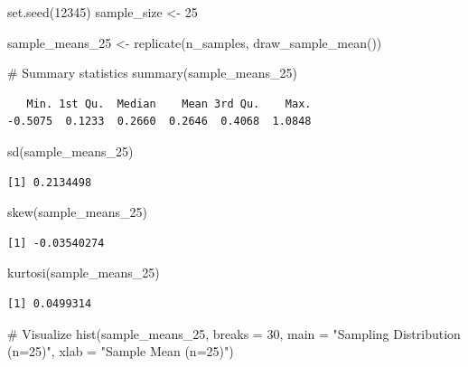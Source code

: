 \documentclass[
  letterpaper,
  DIV=11,
  numbers=noendperiod]{scrreprt}
\newenvironment{Shaded}{\begin{snugshade}}{\end{snugshade}}
\newcommand{\AttributeTok}[1]{\textcolor[rgb]{0.40,0.45,0.13}{#1}}
\newcommand{\CommentTok}[1]{\textcolor[rgb]{0.37,0.37,0.37}{#1}}
\newcommand{\DecValTok}[1]{\textcolor[rgb]{0.68,0.00,0.00}{#1}}
\newcommand{\FunctionTok}[1]{\textcolor[rgb]{0.28,0.35,0.67}{#1}}
\newcommand{\NormalTok}[1]{\textcolor[rgb]{0.00,0.23,0.31}{#1}}
\newcommand{\OtherTok}[1]{\textcolor[rgb]{0.00,0.23,0.31}{#1}}
\newcommand{\StringTok}[1]{\textcolor[rgb]{0.13,0.47,0.30}{#1}}
\begin{document}
\begin{Shaded}
\begin{Highlighting}[]
\FunctionTok{set.seed}\NormalTok{(}\DecValTok{12345}\NormalTok{) }
\NormalTok{sample\_size }\OtherTok{\textless{}{-}} \DecValTok{25} 
 
\NormalTok{sample\_means\_25 }\OtherTok{\textless{}{-}} \FunctionTok{replicate}\NormalTok{(n\_samples, }\FunctionTok{draw\_sample\_mean}\NormalTok{()) }
 
\CommentTok{\# Summary statistics }
\FunctionTok{summary}\NormalTok{(sample\_means\_25) }
\end{Highlighting}
\end{Shaded}

\begin{verbatim}
   Min. 1st Qu.  Median    Mean 3rd Qu.    Max. 
-0.5075  0.1233  0.2660  0.2646  0.4068  1.0848 
\end{verbatim}

\begin{Shaded}
\begin{Highlighting}[]
\FunctionTok{sd}\NormalTok{(sample\_means\_25) }
\end{Highlighting}
\end{Shaded}

\begin{verbatim}
[1] 0.2134498
\end{verbatim}

\begin{Shaded}
\begin{Highlighting}[]
\FunctionTok{skew}\NormalTok{(sample\_means\_25) }
\end{Highlighting}
\end{Shaded}

\begin{verbatim}
[1] -0.03540274
\end{verbatim}

\begin{Shaded}
\begin{Highlighting}[]
\FunctionTok{kurtosi}\NormalTok{(sample\_means\_25) }
\end{Highlighting}
\end{Shaded}

\begin{verbatim}
[1] 0.0499314
\end{verbatim}

\begin{Shaded}
\begin{Highlighting}[]
\CommentTok{\# Visualize }
\FunctionTok{hist}\NormalTok{(sample\_means\_25, }\AttributeTok{breaks =} \DecValTok{30}\NormalTok{, }\AttributeTok{main =} \StringTok{"Sampling Distribution (n=25)"}\NormalTok{, }\AttributeTok{xlab =} \StringTok{"Sample Mean (n=25)"}\NormalTok{) }
\end{Highlighting}
\end{Shaded}
\end{document}
